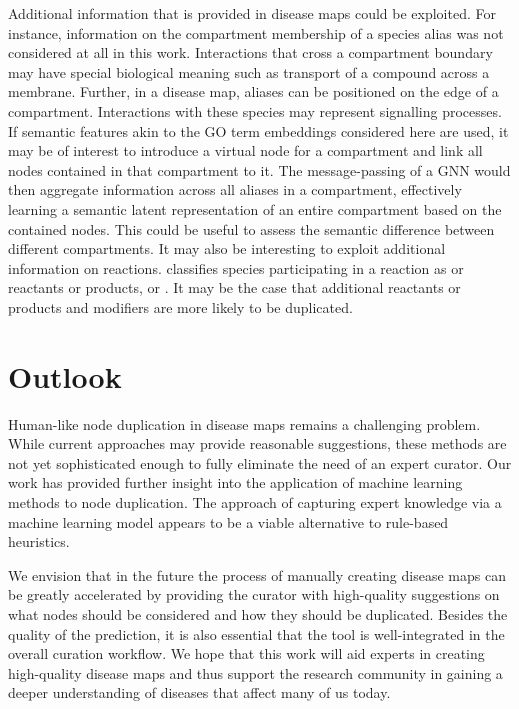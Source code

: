 \documentclass[
	fontsize=10pt, %
	twoside=true, %
	secnumdepth=1, %
  toc=indentunnumbered %
]{kaobook}
\begin{document}
Additional information that is provided in disease maps could be exploited. For
instance, information on the compartment membership of a species alias was not
considered at all in this work. Interactions that cross a compartment boundary
may have special biological meaning such as transport of a compound across a
membrane. Further, in a disease map, aliases can be positioned on the edge of a
compartment. Interactions with these species may represent signalling processes.
%
If semantic features akin to the GO term embeddings considered here are used, it
may be of interest to introduce a virtual node for a compartment and link all
nodes contained in that compartment to it. The message-passing of a GNN would
then aggregate information across all aliases in a compartment, effectively
learning a semantic latent representation of an entire compartment based on the
contained nodes. This could be useful to assess the semantic difference between
different compartments. It may also be interesting to exploit additional
information on reactions. 
classifies species participating in a reaction as  or 
reactants or products, or . It may be the case that additional
reactants or products and modifiers are more likely to be duplicated.
%


\section{Outlook}

Human-like node duplication in disease maps remains a challenging problem. While
current approaches may provide reasonable
suggestions, these methods are not yet sophisticated enough to fully eliminate
the need of an expert curator. Our work has provided further insight into the
application of machine learning methods to node duplication. The
approach of capturing expert knowledge via a machine learning model appears to
be a viable alternative to rule-based heuristics.

We envision that in the future the process of manually creating disease maps
can be greatly accelerated by providing the curator with high-quality
suggestions on what nodes should be considered and how they should be
duplicated. Besides the quality of the prediction, it is also essential that the
tool is well-integrated in the overall curation workflow. We hope that this work
will aid experts in creating high-quality disease maps and thus support the
research community in gaining a deeper understanding of diseases that affect
many of us today.
\end{document}
